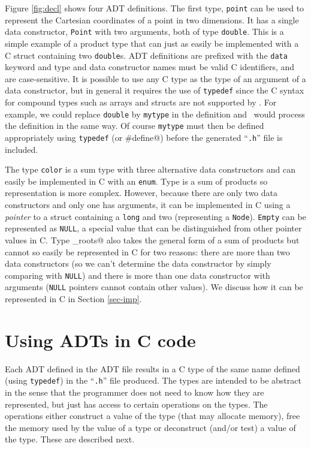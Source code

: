 Figure \ref{fig:decl} shows four ADT definitions. The first type,
\texttt{point} can be used to represent the Cartesian coordinates of a
point in two dimensions.  It has a single data constructor, \texttt{Point}
with two arguments, both of type \texttt{double}.  This is a simple
example of a product type that can just as easily be implemented with
a C struct containing two \texttt{double}s. ADT definitions are prefixed
with the \texttt{data} keyword and type and data constructor names must
be valid C identifiers, and are case-sensitive. It is possible to
use any C type as the type of an argument of a data constructor, but in general
it requires the use of \texttt{typedef} since the C syntax for compound
types such as arrays and structs are not supported by \adtpp.  For example,
we could replace \texttt{double} by \texttt{mytype} in the definition
and \adtpp\ would process the definition in the same way.  Of course
\texttt{mytype} must then be defined appropriately using \texttt{typedef}
(or \verb@#define@) before the generated ``\texttt{.h}'' file is included.

The type \texttt{color} is a sum type with three
alternative data constructors and can easily be implemented in C with an
\texttt{enum}.  Type \verb@tree@ is a sum of products so representation is
more complex.  However, because there are only two data constructors and
only one has arguments, it can be implemented in C using a \emph{pointer}
to a struct containing a \texttt{long} and two \verb@tree@s (representing
a \texttt{Node}).  \texttt{Empty} can be represented as \texttt{NULL},
a special value that can be distinguished from other pointer values
in C.  Type \verb@quad_roots@ also takes the general form of a sum
of products but cannot so easily be represented in C for two reasons:
there are more than two data constructors (so we can't determine the
data constructor by simply comparing with \texttt{NULL}) and there is
more than one data constructor with arguments (\texttt{NULL} pointers
cannot contain other values).  We discuss how it can be represented in
C in Section \ref{sec-imp}.


\section{Using ADTs in C code}
\label{sec-adtc}

Each ADT defined in the ADT file results in a C type of the same name
defined (using \texttt{typedef}) in the ``\texttt{.h}'' file produced.
The types are intended to be abstract in the sense that the programmer
does not need to know how they are represented, but just has access
to certain operations on the types.  The operations either construct a
value of the type (that may allocate memory), free the memory used by
the value of a type or deconstruct (and/or test) a value of the type.
These are described next.

